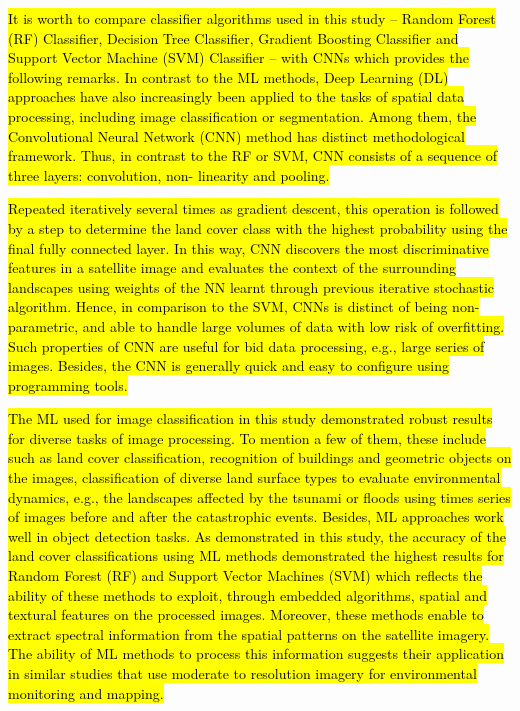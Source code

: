 \documentclass[12pt,a4paper,oneside]{article}
\def \newpar{\vspace{6pt}}
\begin{document}
\newpar \hl{It is worth to compare classifier algorithms used in this study -- Random Forest (RF) Classifier, Decision Tree Classifier, Gradient Boosting Classifier and Support Vector Machine (SVM) Classifier -- with CNNs which provides the following remarks. In contrast to the ML methods, Deep Learning (DL) approaches have also increasingly been applied to the tasks of spatial data processing, including image classification or segmentation. Among them, the Convolutional Neural Network (CNN) method has distinct methodological framework. Thus, in contrast to the RF or SVM, CNN consists of a sequence of three layers: convolution, non- linearity and pooling.}

\newpar \hl{Repeated iteratively several times as gradient descent, this operation is followed by a step to determine the land cover class with the highest probability using the final fully connected layer. In this way, CNN discovers the most discriminative features in a satellite image and evaluates the context of the surrounding landscapes using weights of the NN learnt through previous iterative stochastic algorithm. Hence, in comparison to the SVM, CNNs is distinct of being non-parametric, and able to handle large volumes of data with low risk of overfitting. Such properties of CNN are useful for bid data processing, e.g., large series of images. Besides, the CNN is generally quick and easy to configure using programming tools.}

\newpar \hl{The ML used for image classification in this study demonstrated robust results for diverse tasks of image processing. To mention a few of them, these include such as land cover classification, recognition of buildings and geometric objects on the images, classification of diverse land surface types to evaluate environmental dynamics, e.g., the landscapes affected by the tsunami or floods using times series of images before and after the catastrophic events. Besides, ML approaches work well in object detection tasks. As demonstrated in this study, the accuracy of the land cover classifications using ML methods demonstrated the highest results for Random Forest (RF) and Support Vector Machines (SVM) which reflects the ability of these methods to exploit, through embedded algorithms, spatial and textural features on the processed images. Moreover, these methods enable to extract  spectral information from the spatial patterns on the satellite imagery. The ability of ML methods to process this information suggests their application in similar studies that use moderate to  resolution imagery for environmental monitoring and mapping.}
 
\end{document}
